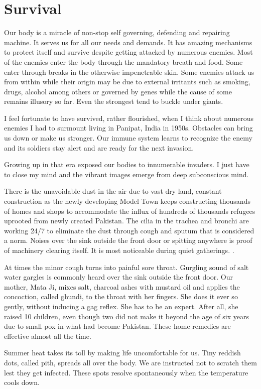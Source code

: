 \chapter{Survival}
Our body is a miracle of non-stop self governing, defending and repairing
machine. It serves us for all our needs and demands. It has amazing
mechanisms to protect itself and survive despite getting attacked by
numerous enemies. Most of the enemies enter the body through the mandatory
breath and food. Some enter through breaks in the otherwise impenetrable
skin. Some enemies attack us from within while their origin may be due to
external irritants such as smoking, drugs, alcohol among others or
governed by genes while the cause of some remains illusory so far. Even
the strongest tend to buckle under giants. 

I feel fortunate to have survived, rather flourished, when I think about
numerous enemies I had to surmount living in Panipat, India in 1950s.
Obstacles can bring us down or make us stronger. Our immune system learns
to recognize the enemy and its soldiers stay alert and are ready for the
next invasion. 

Growing up in that era exposed our bodies to innumerable invaders. I just
have to close my mind and the vibrant images emerge from deep subconscious
mind. 

There is the unavoidable dust in the air due to vast dry land, constant
construction as the newly developing Model Town keeps constructing
thousands of homes and shops to accommodate the influx of hundreds of
thousands refugees uprooted from newly created Pakistan. The cilia in the
trachea and bronchi are working 24/7 to eliminate the dust through cough
and sputum that is considered a norm. Noises over the sink outside the
front door or spitting anywhere is proof of machinery clearing itself. It
is most noticeable during quiet gatherings. . 

At times the minor cough turns into painful sore throat. Gurgling sound of
salt water gargles is commonly heard over the sink outside the front door.
Our mother, Mata Ji, mixes salt, charcoal ashes with mustard oil and
applies the concoction, called ghundi, to the throat with her fingers. She
does it ever so gently, without inducing a gag reflex. She has to be an
expert. After all, she raised 10 children, even though two did not make it
beyond the age of six years due to small pox in what had become Pakistan.
These home remedies are effective almost all the time. 

Summer heat takes its toll by making life uncomfortable for us. Tiny
reddish dots, called pith, spreads all over the body. We are instructed
not to scratch them lest they get infected. These spots resolve
spontaneously when the temperature cools down. 

